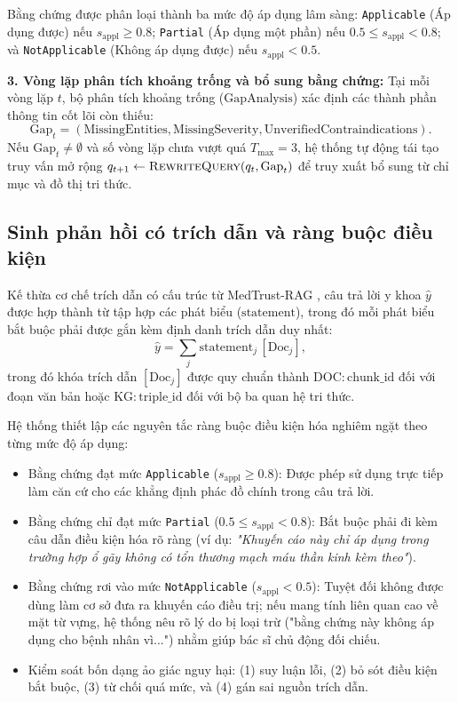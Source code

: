 Bằng chứng được phân loại thành ba mức độ áp dụng lâm sàng: \texttt{Applicable} (Áp dụng được) nếu $s_{\mathrm{appl}} \ge 0.8$; \texttt{Partial} (Áp dụng một phần) nếu $0.5 \le s_{\mathrm{appl}} < 0.8$; và \texttt{NotApplicable} (Không áp dụng được) nếu $s_{\mathrm{appl}} < 0.5$.

\textbf{3. Vòng lặp phân tích khoảng trống và bổ sung bằng chứng:}
Tại mỗi vòng lặp $t$, bộ phân tích khoảng trống ($\mathrm{Gap Analysis}$) xác định các thành phần thông tin cốt lõi còn thiếu:
\begin{equation}
    \mathrm{Gap}_t = (\mathrm{MissingEntities}, \mathrm{MissingSeverity}, \mathrm{UnverifiedContraindications}).
\end{equation}
Nếu $\mathrm{Gap}_t \neq \emptyset$ và số vòng lặp chưa vượt quá $T_{\max} = 3$, hệ thống tự động tái tạo truy vấn mở rộng $q_{t+1} \leftarrow \Call{RewriteQuery}{q_t, \mathrm{Gap}_t}$ để truy xuất bổ sung từ chỉ mục và đồ thị tri thức.

\subsection{Sinh phản hồi có trích dẫn và ràng buộc điều kiện}
Kế thừa cơ chế trích dẫn có cấu trúc từ MedTrust-RAG \cite{medtrustrag}, câu trả lời y khoa $\hat{y}$ được hợp thành từ tập hợp các phát biểu ($\mathrm{statement}$), trong đó mỗi phát biểu bắt buộc phải được gắn kèm định danh trích dẫn duy nhất:
\begin{equation}
    \hat{y} = \sum_{j} \mathrm{statement}_j\, [\mathrm{Doc}_j],
\end{equation}
trong đó khóa trích dẫn $[\mathrm{Doc}_j]$ được quy chuẩn thành $\mathrm{DOC}\!:\!\mathrm{chunk\_id}$ đối với đoạn văn bản hoặc $\mathrm{KG}\!:\!\mathrm{triple\_id}$ đối với bộ ba quan hệ tri thức. 

Hệ thống thiết lập các nguyên tắc ràng buộc điều kiện hóa nghiêm ngặt theo từng mức độ áp dụng:
\begin{itemize}
    \item Bằng chứng đạt mức \texttt{Applicable} ($s_{\mathrm{appl}} \ge 0.8$): Được phép sử dụng trực tiếp làm căn cứ cho các khẳng định phác đồ chính trong câu trả lời.
    \item Bằng chứng chỉ đạt mức \texttt{Partial} ($0.5 \le s_{\mathrm{appl}} < 0.8$): Bắt buộc phải đi kèm câu dẫn điều kiện hóa rõ ràng (ví dụ: \textit{"Khuyến cáo này chỉ áp dụng trong trường hợp ổ gãy không có tổn thương mạch máu thần kinh kèm theo"}).
    \item Bằng chứng rơi vào mức \texttt{NotApplicable} ($s_{\mathrm{appl}} < 0.5$): Tuyệt đối không được dùng làm cơ sở đưa ra khuyến cáo điều trị; nếu mang tính liên quan cao về mặt từ vựng, hệ thống nêu rõ lý do bị loại trừ ("bằng chứng này không áp dụng cho bệnh nhân vì...") nhằm giúp bác sĩ chủ động đối chiếu.
    \item Kiểm soát bốn dạng ảo giác nguy hại: (1) suy luận lỗi, (2) bỏ sót điều kiện bắt buộc, (3) từ chối quá mức, và (4) gán sai nguồn trích dẫn.
\end{itemize}

